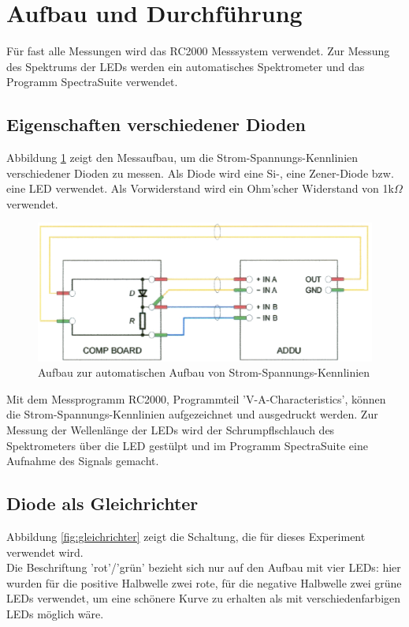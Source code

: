 \documentclass[12pt,a4paper,twopage]{article}
\begin{document}
\section{Aufbau und Durchführung}
Für fast alle Messungen wird das RC2000 Messsystem verwendet. Zur Messung des Spektrums der LEDs werden ein automatisches Spektrometer und das Programm SpectraSuite verwendet.

\subsection{Eigenschaften verschiedener Dioden}
Abbildung \ref{fig:diodenschaltung} zeigt den Messaufbau, um die Strom-Spannungs-Kennlinien verschiedener Dioden zu messen. Als Diode wird eine Si-, eine Zener-Diode bzw. eine LED verwendet. Als Vorwiderstand wird ein Ohm'scher Widerstand von 1k$\Omega$ verwendet.

\begin{center}
\begin{figure}[H]
\includegraphics[scale=0.4]{schaltung.eps}
\caption{Aufbau zur automatischen Aufbau von Strom-Spannungs-Kennlinien}
\label{fig:diodenschaltung}
\end{figure}
\end{center}

Mit dem Messprogramm RC2000, Programmteil 'V-A-Characteristics', können die Strom-Spannungs-Kennlinien aufgezeichnet und ausgedruckt werden. Zur Messung der Wellenlänge der LEDs wird der Schrumpflschlauch des Spektrometers über die LED gestülpt und im Programm SpectraSuite eine Aufnahme des Signals gemacht. 

\subsection{Diode als Gleichrichter}

Abbildung \ref{fig:gleichrichter} zeigt die Schaltung, die für dieses Experiment verwendet wird.\\
Die Beschriftung 'rot'/'grün' bezieht sich nur auf den Aufbau mit vier LEDs: hier wurden für die positive Halbwelle zwei rote, für die negative Halbwelle zwei grüne LEDs verwendet, um eine schönere Kurve zu erhalten als mit verschiedenfarbigen LEDs möglich wäre. 
\end{document}
